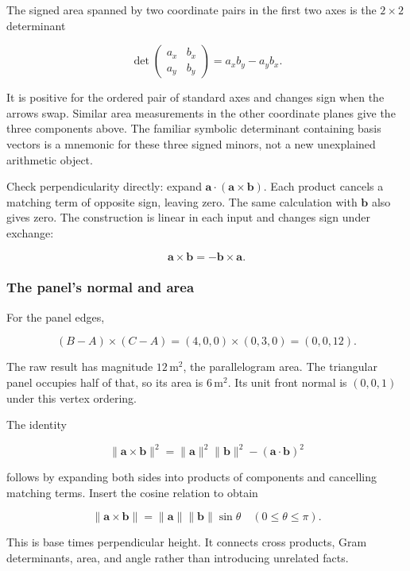 The signed area spanned by two coordinate pairs in the first two axes is the \(2\times2\) determinant

\[
\det\begin{pmatrix}a_x&b_x\\a_y&b_y\end{pmatrix}
=a_xb_y-a_yb_x.
\]

It is positive for the ordered pair of standard axes and changes sign when the arrows swap. Similar area measurements in the other coordinate planes give the three components above. The familiar symbolic determinant containing basis vectors is a mnemonic for these three signed minors, not a new unexplained arithmetic object.

Check perpendicularity directly: expand \(\mathbf a\cdot(\mathbf a\times\mathbf b)\). Each product cancels a matching term of opposite sign, leaving zero. The same calculation with \(\mathbf b\) also gives zero. The construction is linear in each input and changes sign under exchange:

\[
\mathbf a\times\mathbf b=-\mathbf b\times\mathbf a.
\]

\subsubsection{The panel's normal and area}\label{01-foundations-i-ch017-the-panels-normal-and-area}

\hypertarget{01-foundations-i-ch017-the-panels-normal-and-area}{}

For the panel edges,

\[
(B-A)\times(C-A)=(4,0,0)\times(0,3,0)=(0,0,12).
\]

The raw result has magnitude \(12\,\mathrm{m}^2\), the parallelogram area. The triangular panel occupies half of that, so its area is \(6\,\mathrm{m}^2\). Its unit front normal is \((0,0,1)\) under this vertex ordering.

The identity

\[
\|\mathbf a\times\mathbf b\|^2
=\|\mathbf a\|^2\|\mathbf b\|^2-(\mathbf a\cdot\mathbf b)^2
\]

follows by expanding both sides into products of components and cancelling matching terms. Insert the cosine relation to obtain

\[
\|\mathbf a\times\mathbf b\|=\|\mathbf a\|\|\mathbf b\|\sin\theta
\quad(0\le\theta\le\pi).
\]

This is base times perpendicular height. It connects cross products, Gram determinants, area, and angle rather than introducing unrelated facts.

